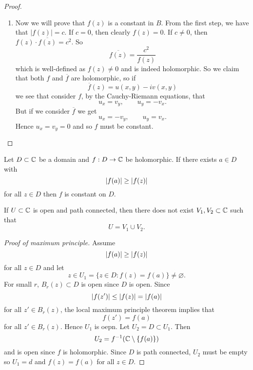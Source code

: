 \begin{proof}
\begin{enumerate}
        \item Now we will prove that $f(z)$ is a constant in $B$.
            From the first step, we have that $\lvert f(z) \rvert = c$.
            If $c = 0$, then clearly $f(z) = 0$.
            If $c \neq 0$, then $f(z) \cdot \overline{f(z)} = c^2$. So
            \[
                \overline{f(z)} = \frac{c^2}{f(z)} 
            \]
            which is well-defined as $f(z) \neq 0$ and is indeed holomorphic.
            So we claim that both $f$ and $\overline f$ are holomorphic, so if
            \[
                \overline f(z) = u(x,y) - iv(x,y)
            \]
            we see that consider $f$, by the Cauchy-Riemann equations, that
            \[
                u_x = v_y, \qquad u_y = -v_x.
            \]
            But if we consider $\overline f$ we get
            \[
                u_x = -v_y, \qquad u_y = v_x.
            \]
            Hence $u_x = v_y = 0$ and so $f$ must be constant.
    \end{enumerate}
\end{proof}

\begin{theorem}
    Let $D \subset \mathbb{C}$ be a domain and
    $f: D \to \mathbb{C}$ be holomorphic.
    If there exists $a \in D$ with
    \[
        \left\lvert f(a)\right\rvert \geq \left\lvert f(z)\right\rvert
    \]
    for all $z \in D$
    then $f$ is constant on $D$.
\end{theorem}

\begin{remark}
    If $U \subset \mathbb{C}$ is open and path connected,
    then there does not exist $V_1, V_2 \subset \mathbb{C}$
    such that
    \[
        U = V_1 \cup V_2.
    \]
\end{remark}

\begin{proof}[Proof of maximum principle]
    Assume
    \[
        \left\lvert f(a)\right\rvert \geq \left\lvert f(z)\right\rvert
    \]
    for all $z \in D$ and let
    \[
        z \in U_1 = \{z \in D: f(z) = f(a)\} \neq \varnothing.
    \]
    For small $r$, $B_r(z) \subset D$ is open since $D$ is open.
    Since 
    \[
        \left\lvert f(z')\right\rvert \leq \left\lvert f(z)\right\rvert = \left\lvert f(a)\right\rvert
    \]
    for all $z' \in B_r(z)$, the local maximum principle theorem
    implies that 
    \[
        f(z') = f(a)
    \]
    for all $z' \in B_r(z)$.
    Hence $U_1$ is oepn.
    Let $U_2 = D \subset U_1$. Then
    \[
        U_2 = f^{-1}(\mathbb{C} \setminus \{f(a)\})
    \]
    and is open since $f$ is holomorphic.
    Since $D$ is path connected, $U_2$ must be empty so $U_1 = d$
    and $f(z) = f(a)$ for all $z \in D$.
\end{proof}

